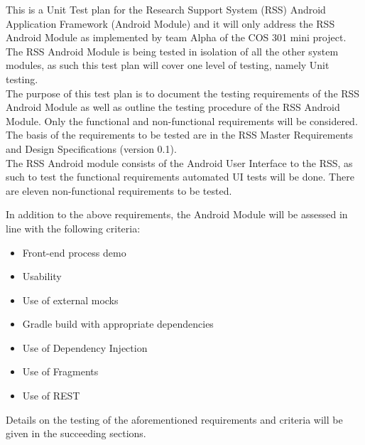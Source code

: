 This is a Unit Test plan for the Research Support System (RSS) Android Application Framework (Android Module) and it will only address the RSS Android Module as implemented by team Alpha of the COS 301 mini project.\\
The RSS Android Module is being tested in isolation of all the other system modules, as such this test plan will cover one level of testing, namely Unit testing.\\
The purpose of this test plan is to document the testing requirements of the RSS Android Module as well as outline the testing procedure of the RSS Android Module. Only the functional and non-functional requirements will be considered. The basis of the requirements to be tested are in the RSS Master Requirements and Design Specifications (version 0.1). \\
The RSS Android module consists of the Android User Interface to the RSS, as such to test the functional requirements automated UI tests will be done.
There are eleven non-functional requirements to be tested.

In addition to the above requirements, the Android Module will be assessed in line with the following criteria:
\begin{itemize}
	\item Front-end process demo
	\item Usability
	\item Use of external mocks
	\item Gradle build with appropriate dependencies
	\item Use of Dependency Injection
	\item Use of Fragments
	\item Use of REST
\end{itemize}

Details on the testing of the aforementioned requirements and criteria will be given in the succeeding sections.